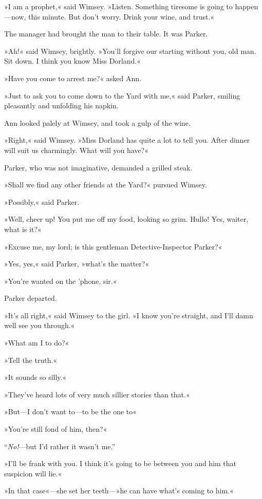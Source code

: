 »I am a prophet,« said Wimsey. »Listen. Something tiresome is going to happen\allowbreak---\allowbreak now, this minute. But don't worry. Drink your wine, and trust.«

The manager had brought the man to their table. It was Parker.

»Ah!« said Wimsey, brightly. »You'll forgive our starting without you, old man. Sit down. I think you know Miss Dorland.«

»Have you come to arrest me?« asked Ann.

»Just to ask you to come down to the Yard with me,« said Parker, smiling pleasantly and unfolding his napkin.

Ann looked palely at Wimsey, and took a gulp of the wine.

»Right,« said Wimsey. »Miss Dorland has quite a lot to tell you. After dinner will suit us charmingly. What will you have?«

Parker, who was not imaginative, demanded a grilled steak.

»Shall we find any other friends at the Yard?« pursued Wimsey.

»Possibly,« said Parker.

»Well, cheer up! You put me off my food, looking so grim. Hullo! Yes, waiter, what is it?«

»Excuse me, my lord; is this gentleman Detective-Inspector Parker?«

»Yes, yes,« said Parker, »what's the matter?«

»You're wanted on the 'phone, sir.«

Parker departed.

»It's all right,« said Wimsey to the girl. »I know you're straight, and I'll damn well see you through.«

»What am I to do?«

»Tell the truth.«

»It sounds so silly.«

»They've heard lots of very much sillier stories than that.«

»But\allowbreak---\allowbreak I don't want to\allowbreak---\allowbreak to be the one to\longdash«

»You're still fond of him, then?«

\enquote{\textit{No!}---but I'd rather it wasn't me.}

»I'll be frank with you. I think it's going to be between you and him that suspicion will lie.«

»In that case«---she set her teeth---»he can have what's coming to him.«

